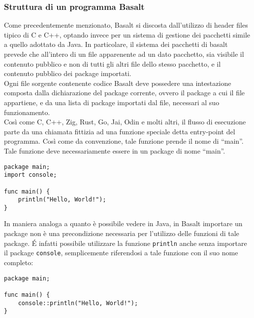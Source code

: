 \subsubsection{Struttura di un programma Basalt}
Come precedentemente menzionato, Basalt si discosta dall'utilizzo di header files tipico di C e C++, optando invece per un sistema di gestione dei pacchetti simile a quello adottato da Java. In particolare, 
il sistema dei pacchetti di basalt prevede che all’intero di un file apparenente ad un dato pacchetto, sia visibile il contenuto pubblico e non di tutti gli altri file dello stesso pacchetto, e il contenuto 
pubblico dei package importati. \\

Ogni file sorgente contenente codice Basalt deve possedere una intestazione composta dalla dichiarazione del package corrente, ovvero il package a cui il file appartiene, e 
da una lista di package importati dal file, necessari al suo funzionamento. \\
 
Così come C, C++, Zig, Rust, Go, Jai, Odin e molti altri, il flusso di esecuzione parte da una chiamata fittizia ad una funzione speciale detta entry-point del programma. Così 
come da convenzione, tale funzione prende il nome di “main”. Tale funzione deve necessariamente essere in un package di nome “main”. \\


\begin{lstlisting}[frame=single]
package main;
import console;

func main() {
    println("Hello, World!");
}
\end{lstlisting}

\vspace{0.5cm}

In maniera analoga a quanto è possibile vedere in Java, in Basalt importare un package non 
è una precondizione necessaria per l'utilizzo delle funzioni di tale package. É infatti possibile
utilizzare la funzione \texttt{println} anche senza importare il package \texttt{console}, semplicemente riferendosi
a tale funzione con il suo nome completo: \\

\begin{lstlisting}[frame=single]
package main;

func main() {
    console::println("Hello, World!");
}
\end{lstlisting}
    